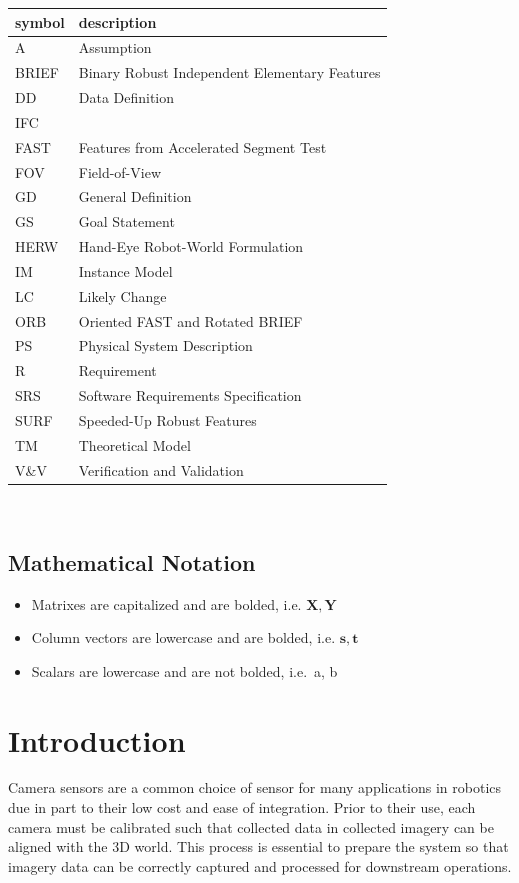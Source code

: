 \documentclass[12pt]{article}
\begin{document}
\renewcommand{\arraystretch}{1.2}
\begin{tabular}{l l} 
  \toprule		
  \textbf{symbol} & \textbf{description}\\
  \midrule 
  A & Assumption\\
  BRIEF & Binary Robust Independent Elementary Features\\ 
  DD & Data Definition\\
  IFC & \progname{}\\
  FAST & Features from Accelerated Segment Test\\
  FOV & Field-of-View\\
  GD & General Definition\\
  GS & Goal Statement\\
  HERW  & Hand-Eye Robot-World Formulation \\
  IM & Instance Model\\
  LC & Likely Change\\
  ORB & Oriented FAST and Rotated BRIEF\\
  PS & Physical System Description\\
  R & Requirement\\
  SRS & Software Requirements Specification\\
  SURF & Speeded-Up Robust Features\\
  TM & Theoretical Model\\
  V\&V & Verification and Validation\\
  \bottomrule
\end{tabular}\\

\subsection{Mathematical Notation}

\begin{itemize}
  \item Matrixes are capitalized and are bolded, i.e. $\mathbf{X, Y}$
  \item Column vectors are lowercase and are bolded, i.e. $\mathbf{s, t}$
  \item Scalars are lowercase and are not bolded, i.e.\ a, b
\end{itemize}

\newpage


\section{Introduction}
Camera sensors are a common choice of sensor for many applications in robotics due 
in part to their low cost and ease of integration. Prior to their use, each camera 
must be calibrated such that collected data in collected imagery can be aligned with 
the 3D world. This process is essential to prepare the system so that 
imagery data can be correctly captured and processed for downstream operations.
\end{document}
